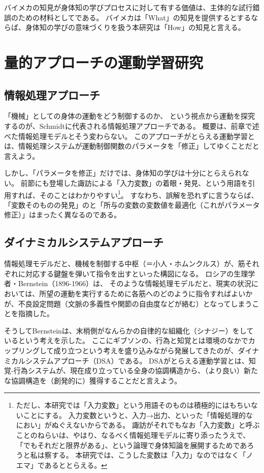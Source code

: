 バイメカの知見が身体知の学びプロセスに対して有する価値は、主体的な試行錯誤のための材料としてである。
バイメカは「What」の知見を提供するとするならば、身体知の学びの意味づくりを扱う本研究は「How」の知見と言える\cite{suwa:2016,horiuchi_suwa:2020}。
\section{量的アプローチの運動学習研究}
\subsection{情報処理アプローチ}
「機械」としての身体の運動をどう制御するのか、
という視点から運動を探究するのが、Schmidt\cite{schmidt:1991}に代表される情報処理アプローチである。
概要は、前章で述べた情報処理モデルとそう変わらない。
このアプローチがとらえる運動学習とは、情報処理システムが運動制御関数のパラメータを「修正」してゆくことだと言えよう。

しかし、「パラメータを修正」だけでは、身体知の学びは十分にとらえられない。
前節にも登場した諏訪による「入力変数」の着眼・発見、という用語を引用すれば、そのことはわかりやすい\footnote{
  ただし、本研究では「入力変数」という用語そのものは積極的にはもちいないことにする。
  入力変数というと、入力→出力、といった「情報処理的なにおい」がぬぐえないからである。
  諏訪がそれでもなお「入力変数」と呼ぶことのねらいは、やはり、なるべく情報処理モデルに寄り添ったうえで、
  「でもそれだと限界がある」、という論理で身体知論を展開するためであろうと私は察する。
  本研究では、こうした変数は「入力」なのではなく「ノエマ」であるととらえる。
}。
すなわち、誤解を恐れずに言うならば、「変数そのものの発見」のと「所与の変数の変数値を最適化（これがパラメータ修正）」はまったく異なるのである。
\subsection{ダイナミカルシステムアプローチ}
情報処理モデルだと、機械を制御する中枢（＝小人・ホムンクルス）が、筋それぞれに対応する鍵盤を弾いて指令を出すといった構図になる。
ロシアの生理学者・Bernstein（1896-1966）\cite{bernstein:1996}は、
そのような情報処理モデルだと、現実の状況においては、所望の運動を実行するために各筋へのどのように指令すればよいかが、不良設定問題（文脈の多義性や関節の自由度などが絡む）となってしまうことを指摘した。

そうしてBernsteinは、末梢側がなんらかの自律的な組織化（シナジー）をしているという考えを示した。
ここにギブソンの、行為と知覚とは環境のなかでカップリングして成り立つという考えを盛り込みながら発展してきたのが、ダイナミカルシステムアプローチ（DSA）である。
DSAがとらえる運動学習とは、知覚-行為システムが、現在成り立っている全身の協調構造から、（より良い）新たな協調構造を（創発的に）獲得することだと言えよう。

